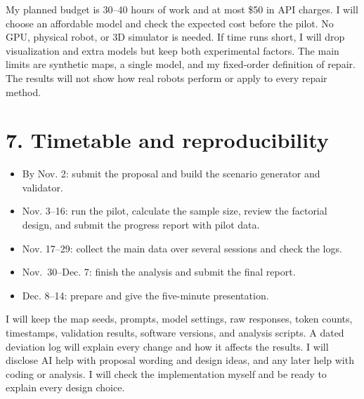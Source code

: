 \documentclass[10.5pt]{article}
\begin{document}
My planned budget is 30--40 hours of work and at most \$50 in API charges. I will choose an affordable model and check the expected cost before the pilot. No GPU, physical robot, or 3D simulator is needed. If time runs short, I will drop visualization and extra models but keep both experimental factors. The main limits are synthetic maps, a single model, and my fixed-order definition of repair. The results will not show how real robots perform or apply to every repair method.

\section*{7. Timetable and reproducibility}
\begin{itemize}
\item By Nov. 2: submit the proposal and build the scenario generator and validator.
\item Nov. 3--16: run the pilot, calculate the sample size, review the factorial design, and submit the progress report with pilot data.
\item Nov. 17--29: collect the main data over several sessions and check the logs.
\item Nov.\ 30--Dec. 7: finish the analysis and submit the final report.
\item Dec. 8--14: prepare and give the five-minute presentation.
\end{itemize}

I will keep the map seeds, prompts, model settings, raw responses, token counts, timestamps, validation results, software versions, and analysis scripts. A dated deviation log will explain every change and how it affects the results. I will disclose AI help with proposal wording and design ideas, and any later help with coding or analysis. I will check the implementation myself and be ready to explain every design choice.
\end{document}
